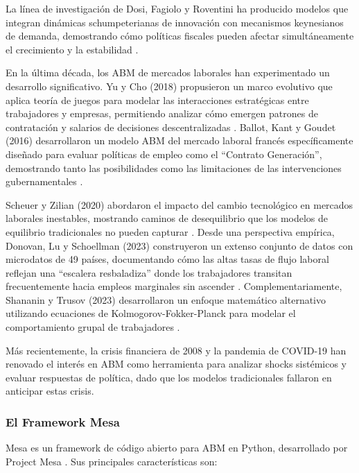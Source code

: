 La línea de investigación de Dosi, Fagiolo y Roventini ha producido modelos que integran dinámicas schumpeterianas de innovación con mecanismos keynesianos de demanda, demostrando cómo políticas fiscales pueden afectar simultáneamente el crecimiento y la estabilidad \cite{dosi2010}.

En la última década, los ABM de mercados laborales han experimentado un desarrollo significativo. Yu y Cho (2018) propusieron un marco evolutivo que aplica teoría de juegos para modelar las interacciones estratégicas entre trabajadores y empresas, permitiendo analizar cómo emergen patrones de contratación y salarios de decisiones descentralizadas \cite{yu2018evolutionary}. Ballot, Kant y Goudet (2016) desarrollaron un modelo ABM del mercado laboral francés específicamente diseñado para evaluar políticas de empleo como el ``Contrato Generación'', demostrando tanto las posibilidades como las limitaciones de las intervenciones gubernamentales \cite{ballot2016abm}.

Scheuer y Zilian (2020) abordaron el impacto del cambio tecnológico en mercados laborales inestables, mostrando caminos de desequilibrio que los modelos de equilibrio tradicionales no pueden capturar \cite{scheuer2020technological}. Desde una perspectiva empírica, Donovan, Lu y Schoellman (2023) construyeron un extenso conjunto de datos con microdatos de 49 países, documentando cómo las altas tasas de flujo laboral reflejan una ``escalera resbaladiza'' donde los trabajadores transitan frecuentemente hacia empleos marginales sin ascender \cite{donovan2023labor}. Complementariamente, Shananin y Trusov (2023) desarrollaron un enfoque matemático alternativo utilizando ecuaciones de Kolmogorov-Fokker-Planck para modelar el comportamiento grupal de trabajadores \cite{shananin2023group}.

Más recientemente, la crisis financiera de 2008 y la pandemia de COVID-19 han renovado el interés en ABM como herramienta para analizar shocks sistémicos y evaluar respuestas de política, dado que los modelos tradicionales fallaron en anticipar estas crisis.

\subsubsection{El Framework Mesa}

Mesa es un framework de código abierto para ABM en Python, desarrollado por Project Mesa \cite{kazil2020mesa, mesa2024}. Sus principales características son:

